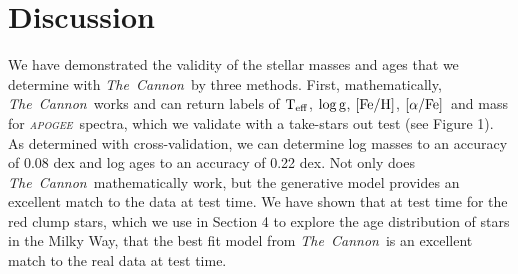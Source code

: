 \documentclass[12pt, preprint]{aastex}
\newcommand{\project}[1]{\textsl{#1}}
\newcommand{\tc}{\project{The~Cannon}}
\newcommand{\apogee}{\project{\textsc{apogee}}}
\newcommand{\teff}{\mbox{$\rm T_{eff}$}}
\newcommand{\feh}{\mbox{$\rm [Fe/H]$}}
\newcommand{\alphafe}{\mbox{$\rm [\alpha/Fe]$}}
\newcommand{\logg}{\mbox{$\rm \log g$}}
\begin{document}

 





\section{Discussion}

We have demonstrated the validity of the stellar masses and ages that we determine with \tc\ by three methods. First, mathematically, \tc\ works and can return labels of \teff, \logg, \feh, \alphafe\ and mass for \apogee\ spectra, which we validate with a take-stars out test (see Figure 1). As determined with cross-validation, we can determine log masses to an accuracy of 0.08 dex and log ages to an accuracy of 0.22 dex. Not only does \tc\ mathematically work, but the generative model provides an excellent match to the data at test time. We have shown that at test time for the red clump stars, which we use in Section 4 to explore the age distribution of stars in the Milky Way, that the best fit model from \tc\ is an excellent match to the real data at test time. 
\end{document}
